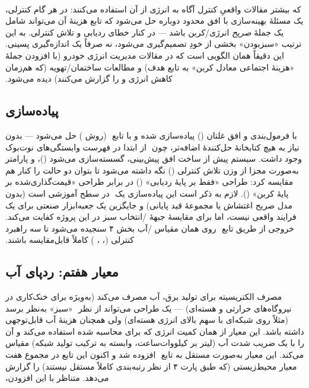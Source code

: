 ‫\documentclass[a4paper,12pt]{article}
\begin{document}
‫که بیشتر مقالات واقعیِ کنترل آگاه به انرژی از آن استفاده می‌کنند: در
‫هر گام کنترلی، یک مسئلهٔ بهینه‌سازی با افق محدود دوباره حل می‌شود که
‫تابع هزینهٔ آن می‌تواند شامل یک جملهٔ \emph{صریح} انرژی/کربن باشد —
‫در کنار خطای ردیابی و تلاش کنترلی. به این ترتیب «سبزبودن» بخشی از
‫خودِ تصمیم‌گیری می‌شود، نه صرفاً یک اندازه‌گیری پسینی. این دقیقاً
‫همان الگویی است که در مقالات مدیریت انرژی خودرو (با افزودن جملهٔ
‫«هزینهٔ اجتماعی معادل کربن» به تابع هدف) و مطالعات 
‫ساختمان/تهویه (که هم‌زمان کاهش انرژی و  را گزارش می‌کنند)
‫دیده می‌شود.
‫
‫\subsection{پیاده‌سازی}
‫ با فرمول‌بندی  و افق غلتان
‫() پیاده‌سازی شده و با تابع
‫ (روش ) حل می‌شود — بدون
‫نیاز به هیچ کتابخانهٔ حل‌کنندهٔ  اضافه‌تر، چون
‫ از ابتدا در فهرست وابستگی‌های نوت‌بوک وجود داشت. سیستم
‫پیش از ساخت افق پیش‌بینی، گسسته‌سازی می‌شود
‫()، و پارامتر \texttt{} به‌صورت مجزا از وزن
‫تلاش کنترلی () نگه داشته می‌شود تا بتوان دو حالت را کنار هم
‫مقایسه کرد: طراحی «فقط بر پایهٔ ردیابی» (\texttt{}) در
‫برابر طراحی «قیمت‌گذاری‌شده بر پایهٔ کربن»
‫(). لازم به ذکر است این پیاده‌سازی یک
‫ در سطح آموزشی است (بدون مدل صریح اغتشاش یا مجموعهٔ قید
‫پایانی) و جایگزین یک جعبه‌ابزار  صنعتی برای یک فرایند واقعی
‫نیست، اما برای مقایسهٔ جبههٔ /انتخاب سبز در این پروژه
‫کفایت می‌کند. خروجی  از طریق تابع
‫\texttt{} روی همان مقیاس /آب
‫بخش ۴ سنجیده می‌شود تا سه راهبرد کنترلی (، ،
‫) کاملاً قابل‌مقایسه باشند.
‫
‫\subsection{معیار هفتم: ردپای آب}
‫مصرف الکتریسیته برای تولید برق، آب مصرف می‌کند (به‌ویژه برای
‫خنک‌کاری در نیروگاه‌های حرارتی و هسته‌ای) — یک طراحی می‌تواند از نظر
‫ «سبز» به‌نظر برسد (مثلاً روی شبکه‌ای با سهم بالای انرژی
‫هسته‌ای) ولی همچنان هزینهٔ آب قابل‌توجهی داشته باشد. این معیار از
‫همان کمیت انرژی که برای  محاسبه شده استفاده می‌کند و آن را
‫با یک ضریب شدت آب (لیتر بر کیلووات‌ساعت، وابسته به ترکیب تولید
‫شبکه) مقیاس می‌کند. این معیار به‌صورت مستقل به تابع
‫\texttt{} افزوده شد و اکنون این تابع در مجموع
‫هفت معیار محیط‌زیستی (که طبق پارت ۴ از نظر رتبه‌بندی کاملاً مستقل نیستند) را گزارش می‌دهد. متناظر با این افزودن،
\end{document}
